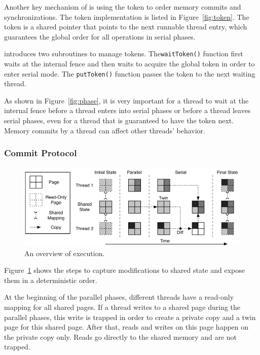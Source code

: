 Another key mechanism of \dthreads{} is using the token to order memory commits and synchronizations. The token implementation is listed in Figure~\ref{fig:token}. The token is a shared pointer that points to the next runnable thread entry, which guarantees the global order for all operations in serial phases.  

\dthreads{} introduces two subroutines to manage tokens.  The\texttt{waitToken()} function first waits at the internal fence and then waits to acquire the global token
in order to enter serial mode. The \texttt{putToken()} function passes the token to the next waiting thread. 

As shown in Figure~\ref{fig:phase}, it is very important for a thread to wait at the internal fence before a thread enters into serial phases or before a thread leaves serial phases, even for a thread that is guaranteed to have the token next. Memory commits by a thread can affect other threads' behavior. 

\subsubsection{Commit Protocol}
\begin{figure}
{\centering
\includegraphics[width=5in]{dthreads/figure/architecture-diagram}
\caption{An overview of \dthreads{} execution.\label{fig:architecture}}
}
\end{figure}

Figure~\ref{fig:architecture} shows the steps to capture modifications to shared state and expose them in a deterministic order.  

At the beginning of the parallel phases, different threads have a read-only mapping for all shared pages. If a thread writes to a shared page during the parallel phases, this write is trapped in order to create a private copy and a twin page for this shared page. After that, reads and writes on this page happen on the private copy only. Reads go directly to the shared memory and are not trapped.  

